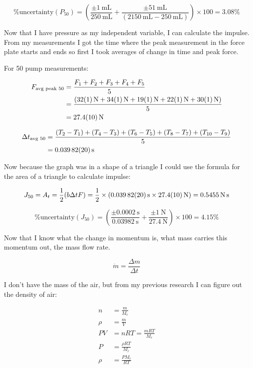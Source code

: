 \documentclass[12pt,a4paper]{article}
\begin{document}
$$\text{\% uncertainty}(P_{50}) = \left(\frac{\pm \SI{1}{\milli\liter}}{\SI{250}{\milli\liter}} + \frac{\pm \SI{51}{\milli\liter}}{(\SI{2150}{\milli\liter} - \SI{250}{\milli\liter})}\right) \times 100 = 3.08\%$$

Now that I have pressure as my independent variable, I can calculate the impulse. From my measurements I got the time where the peak measurement in the force plate starts and ends so first I took averages of change in time and peak force.

For 50 pump measurements:

\begin{align}
F_{\text{avg peak 50}} &= \frac{F_1 + F_2 + F_3 + F_4 + F_5}{5}\\
&= \frac{(\SI{32 \pm 1}{\newton} + \SI{34 \pm 1}{\newton} + \SI{19 \pm 1}{\newton} + \SI{22 \pm 1}{\newton} + \SI{30 \pm 1}{\newton})}{5}\\
&= \SI{27.4 \pm 1}{\newton}
\end{align}

\begin{align}
\Delta t_{\text{avg 50}} &= \frac{(T_2 - T_1) + (T_4 - T_3) + (T_6 - T_5) + (T_8 - T_7) + (T_{10} - T_9)}{5}\\
&= \SI{0.03982 \pm 0.0002}{\second}
\end{align}

Now because the graph was in a shape of a triangle I could use the formula for the area of a triangle to calculate impulse:

$$J_{50} = A_t = \frac{1}{2}(b \Delta t F) = \frac{1}{2} \times (\SI{0.03982 \pm 0.0002}{\second} \times \SI{27.4 \pm 1}{\newton}) = \SI{0.5455}{\newton\second}$$

$$\text{\% uncertainty}(J_{50}) = \left(\frac{\pm \SI{0.0002}{\second}}{\SI{0.03982}{\second}} + \frac{\pm \SI{1}{\newton}}{\SI{27.4}{\newton}}\right) \times 100 = 4.15\%$$

Now that I know what the change in momentum is, what mass carries this momentum out, the mass flow rate.

$$\dot{m} = \frac{\Delta m}{\Delta t}$$

I don't have the mass of the air, but from my previous research I can figure out the density of air:

\begin{align}
n &= \frac{m}{M_r}\\
\rho &= \frac{m}{V}\\
PV &= nRT = \frac{mRT}{M_r}\\
P &= \frac{\rho RT}{M_r}\\
\rho &= \frac{PM_r}{RT}
\end{align}
\end{document}
